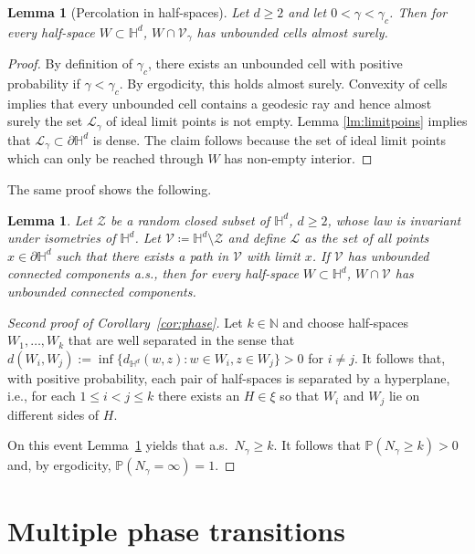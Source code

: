 \documentclass[12pt,a4paper]{article}
\newtheorem{lemma}[proposition]{Lemma}
\theoremstyle{definition}
\renewcommand{\H}{\mathbb{H}}
\newcommand{\N}{\mathbb{N}}
\begin{document}
\begin{lemma}[Percolation in half-spaces] \label{lm:Localization} Let $d\ge2$ and let $0<\gamma<\gamma_c$. Then for every half-space $W\subset\mathbb H^d$, $W\cap \mathcal V_\gamma$ has unbounded cells almost surely. 
\end{lemma}

\begin{proof} By definition of $\gamma_c$, there exists an unbounded cell with positive probability if $\gamma<\gamma_c$. By ergodicity, this holds almost surely. Convexity of cells implies that every unbounded cell contains a geodesic ray and hence almost surely the set $\mathcal L_\gamma$ of ideal limit points is not empty. Lemma \ref{lm:limitpoins} implies that $\mathcal L_\gamma\subset\partial \mathbb H^d$ is dense. The claim follows because the set of ideal limit points which can only be reached through $W$ has non-empty interior.
\end{proof}

The same proof shows the following.

\begin{lemma}
Let \(\mathcal{Z}\) be a random closed subset of \(\H^d\), \(d \geq 2\), whose law is invariant under isometries of \(\H^d\).
Let \(\mathcal{V} \coloneqq \H^d \setminus \mathcal{Z}\) and define \(\mathcal{L}\) as the set of all points \(x \in \partial\H^d\) such that there exists a path in \(\mathcal{V}\) with limit \(x\).
If \(\mathcal{V}\) has unbounded connected components a.s., then for every half-space $W\subset\mathbb H^d$, $W\cap \mathcal V$ has unbounded connected components.
\end{lemma}

\begin{proof}[Second proof of Corollary~\ref{cor:phase}] Let $k\in\N$ and choose half-spaces \(W_1,\ldots,W_k\) that are well separated in the sense that $d(W_i,W_j):=\inf \{d_{\mathbb H^d}(w,z) : w\in  W_i, z\in W_j\} > 0$ for $i\neq j$.
It follows that, with positive probability, each pair of half-spaces is separated by a hyperplane, i.e., for each \(1 \leq i < j \leq k\) there exists an \(H \in \xi\) so that \(W_i\) and \(W_j\) lie on different sides of \(H\).

On this event Lemma~\ref{lm:Localization} yields that a.s.\ \(N_\gamma \geq k\).
It follows that \(\mathbb P(N_\gamma\ge k)>0\) and, by ergodicity, \(\mathbb P(N_\gamma = \infty) = 1\).
\end{proof}

\section{Multiple phase transitions} \label{sec:MultiplePhases}
\end{document}
